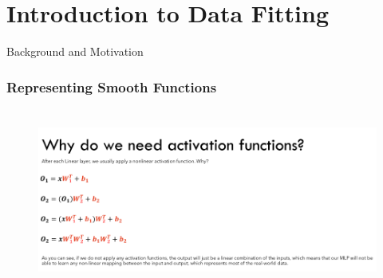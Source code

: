 \documentclass[serif, aspectratio=169]{beamer}
\begin{document}
\section{Introduction to Data Fitting}
\begin{frame}{Background and Motivation}
    \frametitle<presentation>{Representing Smooth Functions}
    \begin{figure}
        \centering
        \includegraphics[height=6cm]{datafit.png}
    \end{figure}
\end{frame}
\end{document}
